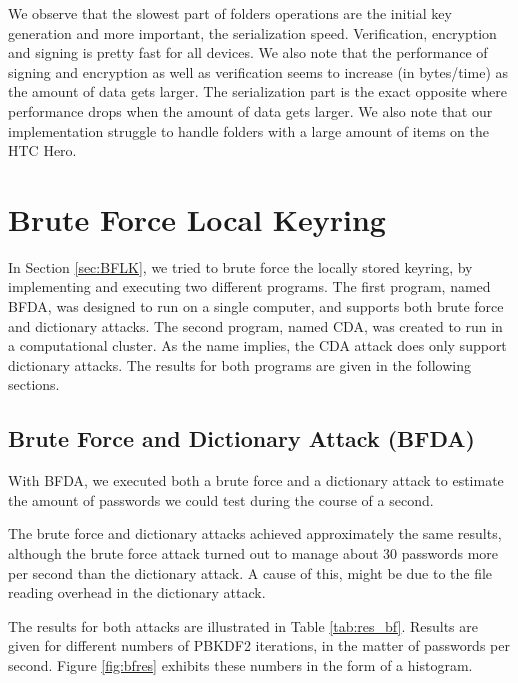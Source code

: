 \documentclass[pdftex,english,10pt,b5paper,twoside]{book}
\begin{document}
We observe that the slowest part of folders operations are the initial key
generation and more important, the serialization speed. Verification,
encryption and signing is pretty fast for all devices. We also note that the
performance of signing and encryption as well as verification seems to increase
(in bytes/time) as the amount of data gets larger. The serialization part is
the exact opposite where performance drops when the amount of data gets larger.
We also note that our implementation struggle to handle folders with a large
amount of items on the HTC Hero.

\section{Brute Force Local Keyring}
\label{sec:R:BFLK}

In Section \ref{sec:BFLK}, we tried to brute force the locally stored keyring,
by implementing and executing two different programs. The first program, named
\acf{BFDA}, was designed to run on a single computer, and supports both brute
force and dictionary attacks. The second program, named \acf{CDA}, was created
to run in a computational cluster. As the name implies, the \ac{CDA} attack
does only support dictionary attacks. The results for both programs are given
in the following sections.

\subsection{Brute Force and Dictionary Attack (BFDA)}

With \ac{BFDA}, we executed both a brute force and a dictionary attack to
estimate the amount of passwords we could test during the course of a second.

The brute force and dictionary attacks achieved approximately the same results,
although the brute force attack turned out to manage about 30 passwords more
per second than the dictionary attack. A cause of this, might be due to the
file reading overhead in the dictionary attack. 

The results for both attacks are illustrated in Table \ref{tab:res_bf}. Results
are given for different numbers of \ac{PBKDF2} iterations, in the matter of
passwords per second. Figure \ref{fig:bfres} exhibits these numbers in the form
of a histogram.


\end{document}

